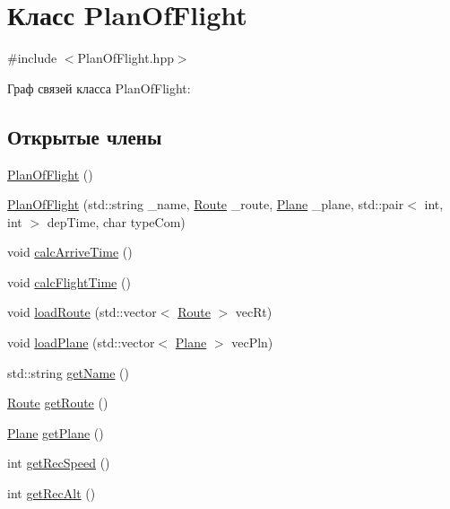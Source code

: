 \hypertarget{class_plan_of_flight}{}\section{Класс Plan\+Of\+Flight}
\label{class_plan_of_flight}


{\ttfamily \#include $<$Plan\+Of\+Flight.\+hpp$>$}



Граф связей класса Plan\+Of\+Flight\+:
\subsection*{Открытые члены}
\begin{DoxyCompactItemize}
\item 
\hyperlink{class_plan_of_flight_a83a69a38400f263a176c4fc9bde86e8b}{Plan\+Of\+Flight} ()
\item 
\hyperlink{class_plan_of_flight_a7f24add89876b7710a0cb8a01a829b3d}{Plan\+Of\+Flight} (std\+::string \+\_\+name, \hyperlink{class_route}{Route} \+\_\+route, \hyperlink{class_plane}{Plane} \+\_\+plane, std\+::pair$<$ int, int $>$ dep\+Time, char type\+Com)
\item 
void \hyperlink{class_plan_of_flight_a09bd4a8025dd20fdbe3be471b7544090}{calc\+Arrive\+Time} ()
\item 
void \hyperlink{class_plan_of_flight_af565d1c41f46c459ee3deefa5a018b41}{calc\+Flight\+Time} ()
\item 
void \hyperlink{class_plan_of_flight_a87aacdfe22c2575886f86c9c153ca9e1}{load\+Route} (std\+::vector$<$ \hyperlink{class_route}{Route} $>$ vec\+Rt)
\item 
void \hyperlink{class_plan_of_flight_a6264f8a387d334edc34b31d15c9170e7}{load\+Plane} (std\+::vector$<$ \hyperlink{class_plane}{Plane} $>$ vec\+Pln)
\item 
std\+::string \hyperlink{class_plan_of_flight_aa24b3910284235291bde76df9247919a}{get\+Name} ()
\item 
\hyperlink{class_route}{Route} \hyperlink{class_plan_of_flight_ab495e5581417cb91781a3712f46a61a5}{get\+Route} ()
\item 
\hyperlink{class_plane}{Plane} \hyperlink{class_plan_of_flight_a1f096d12a2144478290b7b6eb593d89a}{get\+Plane} ()
\item 
int \hyperlink{class_plan_of_flight_a5a3254a3a87eb64cf58beaf9908f3b2c}{get\+Rec\+Speed} ()
\item 
int \hyperlink{class_plan_of_flight_ac3a81bb68ebca1fef964b4b943194ef6}{get\+Rec\+Alt} ()

\end{DoxyCompactItemize}
